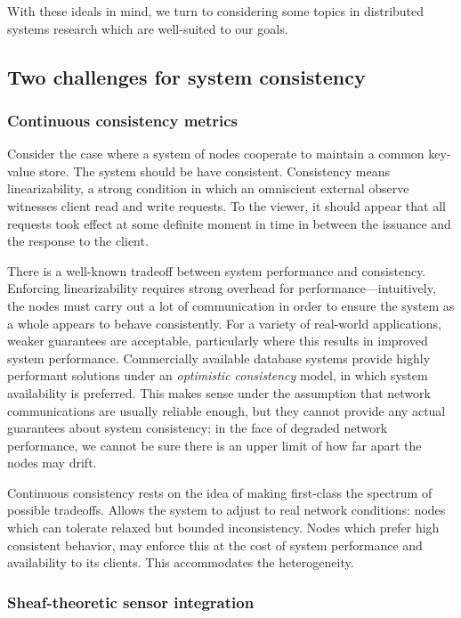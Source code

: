 With these ideals in mind, we turn to considering some topics in distributed
systems research which are well-suited to our goals.

\subsection{Two challenges for system consistency}

\subsubsection{Continuous consistency metrics}

Consider the case where a system of nodes cooperate to maintain a common key-value store. The system should be have consistent. Consistency means linearizability, a strong condition in which an omniscient external observe witnesses client read and write requests. To the viewer, it should appear that all requests took effect at some definite moment in time in between the issuance and the response to the client.

There is a well-known tradeoff between system performance and consistency. Enforcing linearizability requires strong overhead for performance---intuitively, the nodes must carry out a lot of communication in order to ensure the system as a whole appears to behave consistently. For a variety of real-world applications, weaker guarantees are acceptable, particularly where this results in improved system performance. Commercially available database systems provide highly performant solutions under an \emph{optimistic consistency} model, in which system availability is preferred. This makes sense under the assumption that network communications are usually reliable enough, but they cannot provide any actual guarantees about system consistency: in the face of degraded network performance, we cannot be sure there is an upper limit of how far apart the nodes may drift.

Continuous consistency rests on the idea of making first-class the spectrum of possible tradeoffs. Allows the system to adjust to real network conditions: nodes which can tolerate relaxed but bounded inconsistency. Nodes which prefer high consistent behavior, may enforce this at the cost of system performance and availability to its clients. This accommodates the heterogeneity.

\subsubsection{Sheaf-theoretic sensor integration}

